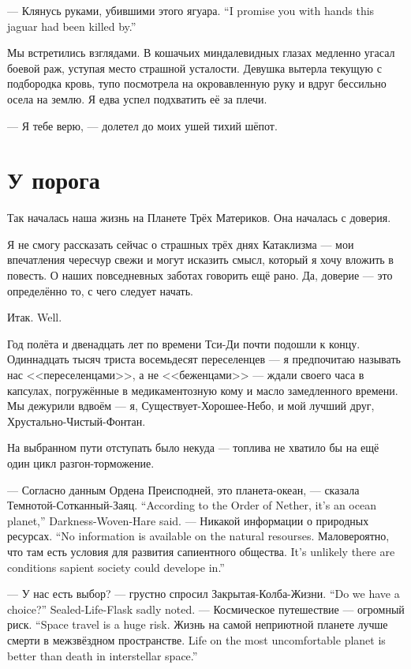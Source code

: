 {--- Клянусь руками, убившими этого ягуара.}
{``I promise you with hands this jaguar had been killed by.''}

Мы встретились взглядами.
В кошачьих миндалевидных глазах медленно угасал боевой раж, уступая место страшной усталости.
Девушка вытерла текущую с подбородка кровь, тупо посмотрела на окровавленную руку и вдруг бессильно осела на землю.
Я едва успел подхватить её за плечи.

--- Я тебе верю, --- долетел до моих ушей тихий шёпот.

\section{У порога}

Так началась наша жизнь на Планете Трёх Материков.
Она началась с доверия.

Я не смогу рассказать сейчас о страшных трёх днях Катаклизма --- мои впечатления чересчур свежи и могут исказить смысл, который я хочу вложить в повесть.
О наших повседневных заботах говорить ещё рано.
Да, доверие --- это определённо то, с чего следует начать.

{Итак.}
{Well.}

Год полёта и двенадцать лет по времени Тси-Ди почти подошли к концу.
Одиннадцать тысяч триста восемьдесят переселенцев --- я предпочитаю называть нас <<переселенцами>>, а не <<беженцами>> --- ждали своего часа в капсулах, погружённые в медикаментозную кому и масло замедленного времени.
Мы дежурили вдвоём --- я, Существует-Хорошее-Небо, и мой лучший друг, Хрустально-Чистый-Фонтан.

На выбранном пути отступать было некуда --- топлива не хватило бы на ещё один цикл разгон-торможение.

{--- Согласно данным Ордена Преисподней, это планета-океан, --- сказала Темнотой-Сотканный-Заяц.}
{``According to the Order of Nether, it's an ocean planet,'' Darkness-Woven-Hare said.}
{--- Никакой информации о природных ресурсах.}
{``No information is available on the natural resourses.}
{Маловероятно, что там есть условия для развития сапиентного общества.}
{It's unlikely there are conditions sapient society could develope in.''}

{--- У нас есть выбор? --- грустно спросил Закрытая-Колба-Жизни.}
{``Do we have a choice?'' Sealed-Life-Flask sadly noted.}
{--- Космическое путешествие --- огромный риск.}
{``Space travel is a huge risk.}
{Жизнь на самой неприютной планете лучше смерти в межзвёздном пространстве.}
{Life on the most uncomfortable planet is better than death in interstellar space.''}

